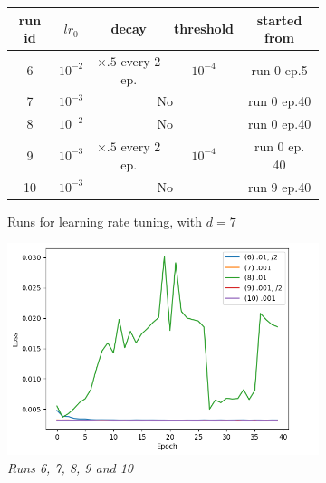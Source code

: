 \documentclass{article}
\begin{document}
        \begin{figure}[!ht]
            \begin{subfigure}{.6\linewidth}
                \begin{tabular}{|c|c|c|c|c|}
                    \hline
                    run id & $lr_0$ & decay & threshold & started from\\
                    \hline
                    \hline
                    6 & $10^{-2}$ & $\times .5$ every 2 ep. & $10^{-4}$ & run 0 ep.5 \\
                    \hline
                    7 & $10^{-3}$ & \multicolumn{2}{|c|}{No} & run 0 ep.40 \\
                    \hline
                    8 & $10^{-2}$ & \multicolumn{2}{|c|}{No} & run 0 ep.40 \\
                    \hline
                    9 & $10^{-3}$ & $\times .5$ every 2 ep. & $10^{-4}$ & run 0 ep. 40 \\
                    \hline
                    10 & $10^{-3}$ & \multicolumn{2}{|c|}{No} & run 9 ep.40\\
                    \hline
                \end{tabular}
                \caption{Runs for learning rate tuning, with $d=7$}
            \end{subfigure}
            \begin{subfigure}{.39\linewidth}
                \centering
                \includegraphics[width=\linewidth]{pics/hpp-lr-loss-678910.png}
                \caption{\textit{Runs 6, 7, 8, 9 and 10}}
                \label{fig:hpp-lr-div}
            \end{subfigure}
            \begin{subfigure}{.49\linewidth}

\end{subfigure}
\end{figure}
\end{document}
